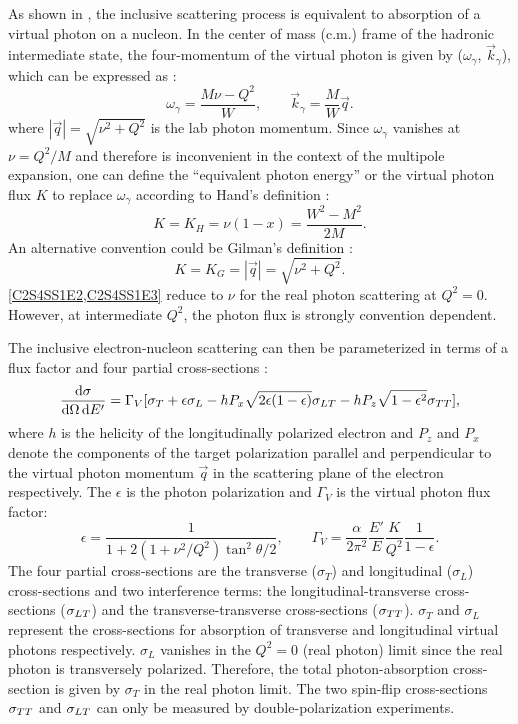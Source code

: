 As shown in , the inclusive scattering process is equivalent to absorption of a virtual photon on a nucleon. In the center of mass (c.m.) frame of the hadronic intermediate state, the four-momentum of the virtual photon is given by ($\omega_\gamma$, $\vec{k}_\gamma$), which can be expressed as \cite{Drechsel2004}:
\begin{equation} \label{C2S4SS1E1}
\omega_\gamma = \frac{M\nu-Q^2}{W}, \qquad \vec{k}_\gamma = \frac{M}{W}\vec{q}.
\end{equation}
where $|\vec{q}|=\sqrt{\nu^2+Q^2}$ is the lab photon momentum. Since $\omega_\gamma$ vanishes at $\nu=Q^2/M$ and therefore is inconvenient in the context of the multipole expansion, one can define the ``equivalent photon energy'' or the virtual photon flux $K$ to replace $\omega_\gamma$ according to Hand's definition \cite{Hand1963}:
\begin{equation} \label{C2S4SS1E2}
K = K_H = \nu(1-x) = \frac{W^2-M^2}{2M}.
\end{equation}
An alternative convention could be Gilman's definition \cite{Gilman1968}:
\begin{equation} \label{C2S4SS1E3}
K = K_G = |\vec{q}| = \sqrt{\nu^2+Q^2}.
\end{equation}
\cref{C2S4SS1E2,C2S4SS1E3} reduce to $\nu$ for the real photon scattering at $Q^2=0$. However, at intermediate $Q^2$, the photon flux is strongly convention dependent.

The inclusive electron-nucleon scattering can then be parameterized in terms of a flux factor and four partial cross-sections \cite{Drechsel2001}:
\begin{equation} \label{C2S4SS1E4}
\frac{\dd{\sigma}}{\dd{\Omega}\dd{E'}} = \Gamma_V[\sigma_T+\epsilon\sigma_L-hP_x\sqrt{2\epsilon(1-\epsilon)}\sigma_{LT}-hP_z\sqrt{1-\epsilon^2}\sigma_{TT}],
\end{equation}
where $h$ is the helicity of the longitudinally polarized electron and $P_z$ and $P_x$ denote the components of the target polarization parallel and perpendicular to the virtual photon momentum $\vec{q}$ in the scattering plane of the electron respectively. The $\epsilon$ is the photon polarization and $\Gamma_V$ is the virtual photon flux factor:
\begin{equation*}
\epsilon = \frac{1}{1+2(1+\nu^2/Q^2)\tan^2\theta/2}, \qquad \Gamma_V = \frac{\alpha}{2\pi^2}\frac{E'}{E}\frac{K}{Q^2}\frac{1}{1-\epsilon}.
\end{equation*}
The four partial cross-sections are the transverse ($\sigma_T$) and longitudinal ($\sigma_L$) cross-sections and two interference terms: the longitudinal-transverse cross-sections ($\sigma_{LT}$) and the transverse-transverse cross-sections ($\sigma_{TT}$). $\sigma_T$ and $\sigma_L$ represent the cross-sections for absorption of transverse and longitudinal virtual photons respectively. $\sigma_L$ vanishes in the $Q^2=0$ (real photon) limit since the real photon is transversely polarized. Therefore, the total photon-absorption cross-section is given by $\sigma_T$ in the real photon limit. The two spin-flip cross-sections $\sigma_{TT}$ and $\sigma_{LT}$ can only be measured by double-polarization experiments.

